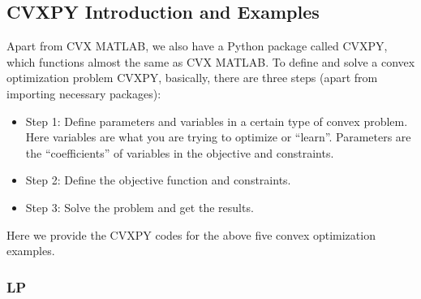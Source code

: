\documentclass[
]{book}
\theoremstyle{definition}
\theoremstyle{definition}
\theoremstyle{definition}
\theoremstyle{definition}
\theoremstyle{remark}
\begin{document}
\subsection{CVXPY Introduction and Examples}\label{cvxpy-introduction-and-examples}

Apart from CVX MATLAB, we also have a Python package called CVXPY, which functions almost the same as CVX MATLAB. To define and solve a convex optimization problem CVXPY, basically, there are three steps (apart from importing necessary packages):

\begin{itemize}
\item
  Step 1: Define parameters and variables in a certain type of convex problem. Here variables are what you are trying to optimize or ``learn''. Parameters are the ``coefficients'' of variables in the objective and constraints.
\item
  Step 2: Define the objective function and constraints.
\item
  Step 3: Solve the problem and get the results.
\end{itemize}

Here we provide the CVXPY codes for the above five convex optimization examples.

\subsubsection{LP}\label{lp}
\end{document}
